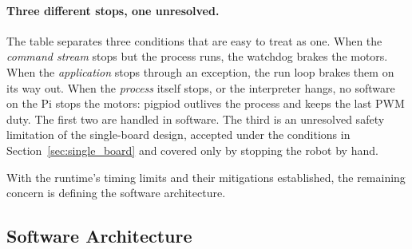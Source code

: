\paragraph{Three different stops, one unresolved.}
The table separates three conditions that are easy to treat as one. When the
\emph{command stream} stops but the process runs, the watchdog brakes the
motors. When the \emph{application} stops through an exception, the run loop
brakes them on its way out. When the \emph{process} itself stops, or the
interpreter hangs, no software on the Pi stops the motors: pigpiod outlives the
process and keeps the last PWM duty. The first two are handled in software. The
third is an unresolved safety limitation of the single-board design, accepted
under the conditions in Section~\ref{sec:single_board} and covered only by
stopping the robot by hand.

With the runtime's timing limits and their mitigations established, the
remaining concern is defining the software architecture.

\subsection{Software Architecture}\label{sec:software_architecture}

